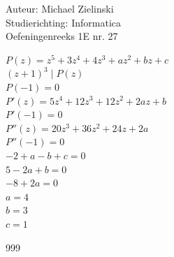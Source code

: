 \documentclass[a4paper]{article}
\begin{document}
\noindent \large Auteur: Michael Zielinski \\
\noindent \large Studierichting: Informatica\\
\noindent \large Oefeningenreeks 1E nr. 27\\
\medskip

\normalsize

$P(z)=z^{5}+3z^{4}+4z^{3}+az^{2}+bz+c$\\

$(z+1)^{3}\mid P(z)$\\

$P(-1)=0$\\

$P'(z)=5z^{4}+12z^{3}+12z^{2}+2az+b$\\

$P'(-1)=0$\\

$P''(z)=20z^{3}+36z^{2}+24z+2a$\\

$P''(-1)=0$\\

$-2+a-b+c=0$\\

$5-2a+b=0$\\

$-8+2a=0$\\

$a=4$\\

$b=3$\\

$c=1$\\

\begin{thebibliography}{999}
\end{thebibliography}
\end{document}
